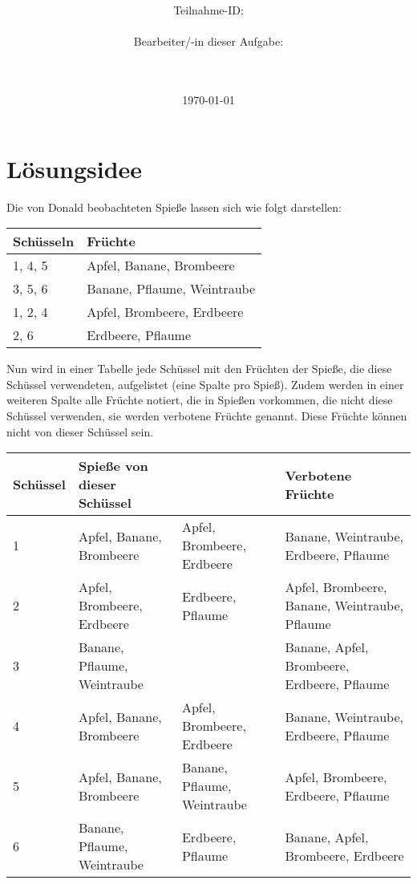 \documentclass[a4paper,10pt,ngerman]{scrartcl}
\title{\textbf{\Huge\Aufgabe}}
\author{\LARGE Teilnahme-ID: \LARGE \TeilnahmeId \\\\
	    \LARGE Bearbeiter/-in dieser Aufgabe: \\ 
	    \LARGE \Name\\\\}
\date{\LARGE\today}
\begin{document}
\maketitle
\tableofcontents

\vspace{0.5cm}

\section{Lösungsidee}
Die von Donald beobachteten Spieße lassen sich wie folgt darstellen:

\begin{center}
\begin{tabular}{l|l}
    \textbf{Schüsseln} & \textbf{Früchte} \\
    \hline
    1, 4, 5 & Apfel, Banane, Brombeere \\
    3, 5, 6 & Banane, Pflaume, Weintraube \\
    1, 2, 4 & Apfel, Brombeere, Erdbeere \\
    2, 6 & Erdbeere, Pflaume
\end{tabular}
\end{center}

Nun wird in einer Tabelle jede Schüssel mit den Früchten der Spieße, die diese Schüssel verwendeten, aufgelistet (eine Spalte pro Spieß).
Zudem werden in einer weiteren Spalte alle Früchte notiert, die in Spießen vorkommen, die nicht diese Schüssel verwenden, sie werden verbotene Früchte genannt.
Diese Früchte können nicht von dieser Schüssel sein.

\begin{center}
\begin{tabularx}{\linewidth}{l|X|X|X}
    \textbf{Schüssel} & \textbf{Spieße von dieser Schüssel} & & \textbf{Verbotene Früchte} \\
    \hline
    1 & Apfel, Banane, Brombeere & Apfel, Brombeere, Erdbeere & Banane, Weintraube, Erdbeere, Pflaume \\
    \hline
    2 & Apfel, Brombeere, Erdbeere & Erdbeere, Pflaume & Apfel, Brombeere, Banane, Weintraube, Pflaume \\
    \hline
    3 & Banane, Pflaume, Weintraube & & Banane, Apfel, Brombeere, Erdbeere, Pflaume \\
    \hline
    4 & Apfel, Banane, Brombeere & Apfel, Brombeere, Erdbeere & Banane, Weintraube, Erdbeere, Pflaume \\
    \hline
    5 & Apfel, Banane, Brombeere & Banane, Pflaume, Weintraube & Apfel, Brombeere, Erdbeere, Pflaume \\
    \hline
    6 & Banane, Pflaume, Weintraube & Erdbeere, Pflaume & Banane, Apfel, Brombeere, Erdbeere
\end{tabularx}
\end{center}
\end{document}
